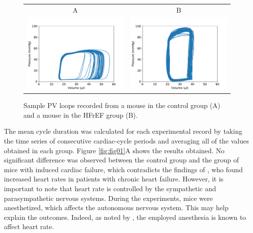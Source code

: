 \documentclass[%
preprint,
 amsmath,amssymb,
 aps,
]{revtex4-2}
\begin{document}
\begin{figure}[h!]
    \begin{tabular}{cc}
        A & B \\
        \includegraphics[width=3in]{PVLoops_A.pdf} &
        \includegraphics[width=3in]{PVLoops_B.pdf}
    \end{tabular}
    \caption{Sample PV loops recorded from a mouse in the control group (A) and a mouse in the HFrEF group (B).}
    \label{fig:PVLoops}
\end{figure}

The mean cycle duration was calculated for each experimental record by taking the time series of consecutive cardiac-cycle periods and averaging all of the values obtained in each group. Figure \ref{fig:fig01}A shows the results obtained. No significant difference was observed between the control group and the group of mice with induced cardiac failure, which contradicts the findings of \citet{Kamen_1995}, who found increased heart rates in patients with chronic heart failure. However, it is important to note that heart rate is controlled by the sympathetic and parasympathetic nervous systems. During the experiments, mice were anesthetized, which affects the autonomous nervous system. This may help explain the outcomes. Indeed, as noted by \citep{Nishiyama_2016, Kato_1992}, the employed anesthesia is known to affect heart rate.
\end{document}
